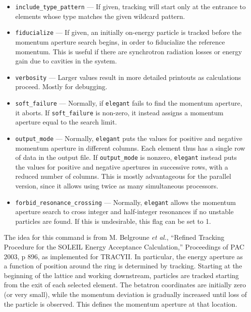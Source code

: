 \documentclass[11pt]{article}
\begin{document}
\begin{itemize}
\item \verb|include_type_pattern| --- If given, tracking will start
only at the entrance to elements whose type matches the given wildcard
pattern.

\item \verb|fiducialize| --- If given, an initially on-energy particle is tracked before
 the momentum aperture search begins, in order to fiducialize the reference momentum.
 This is useful if there are synchrotron radiation losses or energy gain due to cavities
 in the system.

\item \verb|verbosity| --- Larger values result in more detailed
printouts as calculations proceed.  Mostly for debugging.

\item \verb|soft_failure| --- Normally, if {\tt elegant} fails to find the momentum aperture,
it aborts.  If \verb|soft_failure| is non-zero, it instead assigns a momentum aperture equal
to the search limit.

\item \verb|output_mode| --- Normally, {\tt elegant} puts the values for positive and
negative momentum aperture in different columns.  Each element thus has a single row of
data in the output file.  If \verb|output_mode| is nonzero, {\tt elegant} instead puts
the values for positive and negative apertures in successive rows, with a reduced number
of columns.  This is mostly advantageous for the parallel version, since it allows using
twice as many simultaneous processors.

\item \verb|forbid_resonance_crossing| --- Normally, {\tt elegant} allows the momentum
aperture search to cross integer and half-integer resonances if no unstable particles are
found.  If this is undesirable, this flag can be set to 1.
\end{itemize}

The idea for this command is from M. Belgroune {\em et al.}, ``Refined
Tracking Procedure for the SOLEIL Energy Acceptance Calculation,''
Proceedings of PAC 2003, p 896, as implemented for TRACYII.  In
particular, the energy aperture as a function of position around the
ring is determined by tracking.  Starting at the beginning of the
lattice and working downstream, particles are tracked starting from
the exit of each selected element.  The betatron coordinates are
initially zero (or very small), while the momentum deviation is
gradually increased until loss of the particle is observed.  This
defines the momentum aperture at that location.
\end{document}
